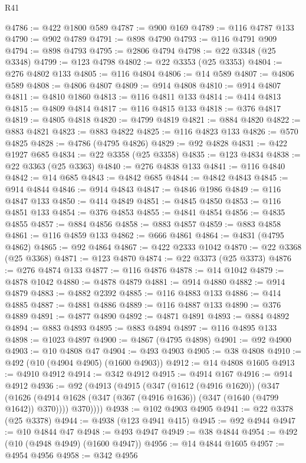 \begin{lexlean}{R41}
\begin{coremodule}
@4786 := @422 @1800 @589
@4787 := @900 @169
@4789 := @116 @4787 @133
@4790 := @902 @4789
@4791 := @898 @4790
@4793 := @116 @4791 @909
@4794 := @898 @4793
@4795 := @2806 @4794
@4798 := @22 @3348 (@25 @3348)
@4799 := @123 @4798
@4802 := @22 @3353 (@25 @3353)
@4804 := @276 @4802 @133
@4805 := @116 @4804
@4806 := @14 @589
@4807 := @4806 @589
@4808 := @4806 @4807
@4809 := @914 @4808
@4810 := @914 @4807
@4811 := @4810 @1860
@4813 := @116 @4811 @133
@4814 := @414 @4813
@4815 := @4809 @4814
@4817 := @116 @4815 @133
@4818 := @376 @4817
@4819 := @4805 @4818
@4820 := @4799 @4819
@4821 := @884 @4820
@4822 := @883 @4821
@4823 := @883 @4822
@4825 := @116 @4823 @133
@4826 := @570 @4825
@4828 := @4786 (@4795 @4826)
@4829 := @92 @4828
@4831 := @422 @1927 @685
@4834 := @22 @3358 (@25 @3358)
@4835 := @123 @4834
@4838 := @22 @3363 (@25 @3363)
@4840 := @276 @4838 @133
@4841 := @116 @4840
@4842 := @14 @685
@4843 := @4842 @685
@4844 := @4842 @4843
@4845 := @914 @4844
@4846 := @914 @4843
@4847 := @4846 @1986
@4849 := @116 @4847 @133
@4850 := @414 @4849
@4851 := @4845 @4850
@4853 := @116 @4851 @133
@4854 := @376 @4853
@4855 := @4841 @4854
@4856 := @4835 @4855
@4857 := @884 @4856
@4858 := @883 @4857
@4859 := @883 @4858
@4861 := @116 @4859 @133
@4862 := @666 @4861
@4864 := @4831 (@4795 @4862)
@4865 := @92 @4864
@4867 := @422 @2333 @1042
@4870 := @22 @3368 (@25 @3368)
@4871 := @123 @4870
@4874 := @22 @3373 (@25 @3373)
@4876 := @276 @4874 @133
@4877 := @116 @4876
@4878 := @14 @1042
@4879 := @4878 @1042
@4880 := @4878 @4879
@4881 := @914 @4880
@4882 := @914 @4879
@4883 := @4882 @2392
@4885 := @116 @4883 @133
@4886 := @414 @4885
@4887 := @4881 @4886
@4889 := @116 @4887 @133
@4890 := @376 @4889
@4891 := @4877 @4890
@4892 := @4871 @4891
@4893 := @884 @4892
@4894 := @883 @4893
@4895 := @883 @4894
@4897 := @116 @4895 @133
@4898 := @1023 @4897
@4900 := @4867 (@4795 @4898)
@4901 := @92 @4900
@4903 := @10 @4808 @47
@4904 := @493 @4903
@4905 := @38 @4808
@4910 := @492 (@10 (@4904 @4905) (@1600 @4903))
@4912 := @14 @4808 @1605
@4913 := @4910 @4912
@4914 := @342 @4912
@4915 := @4914 @167
@4916 := @914 @4912
@4936 := @92
    (@4913
      (@4915
        (@347
          (@1612 (@4916 @1620))
          (@347
            (@1626 (@4914 @1628 (@347 (@367 (@4916 @1636)) (@347 (@1640 (@4799 @1642)) @370))))
            @370))))
@4938 := @102 @4903 @4905
@4941 := @22 @3378 (@25 @3378)
@4944 := @4938 (@123 @4941 @415)
@4945 := @92 @4944
@4947 := @10 @4844 @47
@4948 := @493 @4947
@4949 := @38 @4844
@4954 := @492 (@10 (@4948 @4949) (@1600 @4947))
@4956 := @14 @4844 @1605
@4957 := @4954 @4956
@4958 := @342 @4956

\end{coremodule}
\end{lexlean}
